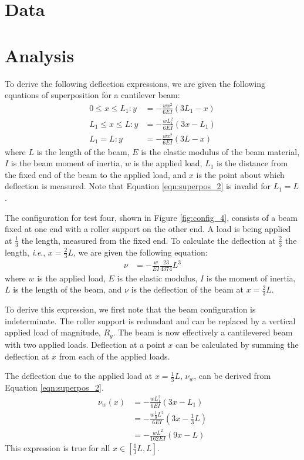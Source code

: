 \documentclass[12 pt]{article}
\newcommand{\ie}{\textit{i}.\textit{e}., }
\begin{document}
\section{Data} \label{data}

\section{Analysis} \label{analysis}
To derive the following deflection expressions, we are given the following equations of superposition for a cantilever beam:
\begin{align}
	0\le{}x\le{}L_1:y&=-\frac{wx^2}{6EI}(3L_1-x)\label{eqn:superpos_1}\\
	L_1\le{}x\le{}L:y&=-\frac{wL_1^2}{6EI}(3x-L_1)\label{eqn:superpos_2}\\
	L_1=L:y&=-\frac{wx^2}{6EI}(3L-x)\label{eqn:superpos_3}
\end{align}
where $L$ is the length of the beam, $E$ is the elastic modulus of the beam material, $I$ is the beam moment of inertia, $w$ is the applied load, $L_1$ is the distance from the fixed end of the beam to the applied load, and $x$ is the point about which deflection is measured. Note that Equation \ref{eqn:superpos_2} is invalid for $L_1=L$.

The configuration for test four, shown in Figure \ref{fig:config_4}, consists of a beam fixed at one end with a roller support on the other end. A load is being applied at $\frac{1}{3}$ the length, measured from the fixed end. To calculate the deflection at $\frac{2}{3}$ the length, \ie $x=\frac{2}{3}L$, we are given the following equation:
\begin{align} \label{eqn:config_4-deflection}
	\nu&=-\frac{w}{EI}\frac{23}{4374}L^3
\end{align}
where $w$ is the applied load, $E$ is the elastic modulus, $I$ is the moment of inertia, $L$ is the length of the beam, and $\nu$ is the deflection of the beam at $x=\frac{2}{3}L$.

To derive this expression, we first note that the beam configuration is indeterminate. The roller support is redundant and can be replaced by a vertical applied load of magnitude, $R_y$. The beam is now effectively a cantilevered beam with two applied loads. Deflection at a point $x$ can be calculated by summing the deflection at $x$ from each of the applied loads.

The deflection due to the applied load at $x=\frac{1}{3}L$, $\nu_w$, can be derived from Equation \ref{eqn:superpos_2}.
\begin{align*}
	\nu_w(x)&=-\frac{wL_1^2}{6EI}(3x-L_1)\\
	&=-\frac{w\frac{1}{9}L^2}{6EI}(3x-\frac{1}{3}L)\\
	&=-\frac{wL^2}{162EI}(9x-L)
\end{align*}
This expression is true for all $x\in[\frac{1}{3}L,L]$.
\end{document}
